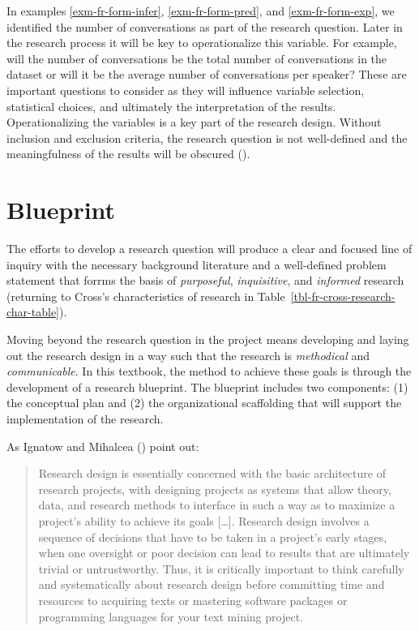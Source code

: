 \documentclass[
  letterpaper,
]{latex/krantz}
\theoremstyle{definition}
\theoremstyle{remark}
\begin{document}
In examples \ref{exm-fr-form-infer}, \ref{exm-fr-form-pred}, and
\ref{exm-fr-form-exp}, we identified the number of conversations as part
of the research question. Later in the research process it will be key
to operationalize this variable. For example, will the number of
conversations be the total number of conversations in the dataset or
will it be the average number of conversations per speaker? These are
important questions to consider as they will influence variable
selection, statistical choices, and ultimately the interpretation of the
results. Operationalizing the variables is a key part of the research
design. Without inclusion and exclusion criteria, the research question
is not well-defined and the meaningfulness of the results will be
obscured ().

\section{Blueprint}\label{sec-fr-blueprint}

The efforts to develop a research question will produce a clear and
focused line of inquiry with the necessary background literature and a
well-defined problem statement that forrms the basis of
\emph{purposeful}, \emph{inquisitive}, and \emph{informed} research
(returning to Cross's characteristics of research in
Table~\ref{tbl-fr-cross-research-char-table}).

Moving beyond the research question in the project means developing and
laying out the research design in a way such that the research is
\emph{methodical} and \emph{communicable}. In this textbook, the method
to achieve these goals is through the development of a research
blueprint. The blueprint includes two components: (1) the conceptual
plan and (2) the organizational scaffolding that will support the
implementation of the research.

As Ignatow and Mihalcea () point out:

\begin{quote}
Research design is essentially concerned with the basic architecture of
research projects, with designing projects as systems that allow theory,
data, and research methods to interface in such a way as to maximize a
project's ability to achieve its goals {[}\ldots{]}. Research design
involves a sequence of decisions that have to be taken in a project's
early stages, when one oversight or poor decision can lead to results
that are ultimately trivial or untrustworthy. Thus, it is critically
important to think carefully and systematically about research design
before committing time and resources to acquiring texts or mastering
software packages or programming languages for your text mining project.
\end{quote}
\end{document}
